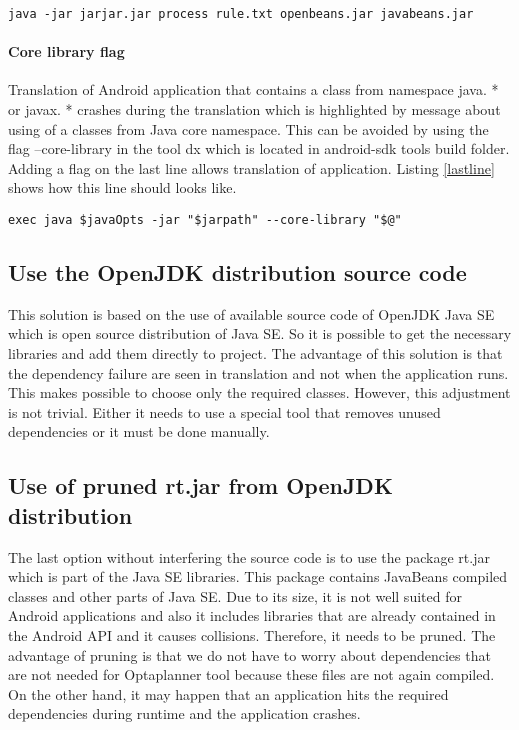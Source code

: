 \begin{lstlisting}[captionpos={b},caption={Command for repacking jar.},frame={lines},label={command},basicstyle=\footnotesize]
java -jar jarjar.jar process rule.txt openbeans.jar javabeans.jar
\end{lstlisting}

\paragraph{Core library flag}
Translation of Android application that contains a class from namespace java. * or javax. * crashes during the translation which is highlighted by message about using of a classes from Java core namespace. This can be avoided by using the flag --core-library in the tool dx which is located in android-sdk tools build folder. Adding a flag on the last line allows translation of application. Listing \ref{lastline} shows how this line should looks like.
\\
\begin{lstlisting}[captionpos={b},caption={Spanning tree broadcast algorithm.},frame={lines},label={lastline},basicstyle=\footnotesize]
exec java $javaOpts -jar "$jarpath" --core-library "$@"
\end{lstlisting}

\subsection{Use the OpenJDK distribution source code}
This solution is based on the use of available source code of OpenJDK Java SE which is open source distribution of Java SE. So it is possible to get the necessary libraries and add them directly to project. The advantage of this solution is that the dependency failure are seen in translation and not when the application runs. This makes possible to choose only the required classes. However, this adjustment is not trivial. Either it needs to use a special tool that removes unused dependencies or it must be done manually.

\subsection{Use of pruned rt.jar from OpenJDK distribution}
The last option without interfering the source code is to use the package rt.jar which is part of the Java SE libraries. This package contains JavaBeans compiled classes and other parts of Java SE. Due to its size, it is not well suited for Android applications and also it includes libraries that are already contained in the Android API and it causes collisions. Therefore, it needs to be pruned. The advantage of pruning is that we do not have to worry about dependencies that are not needed for Optaplanner tool because these files are not again compiled. On the other hand, it may happen that an application hits the required dependencies during runtime and the application crashes.

